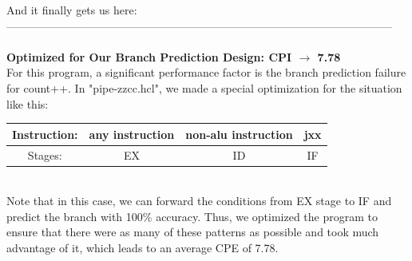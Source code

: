 \documentclass{article}
\begin{document}
And it finally gets us here:\\
--------------------------------------------------------------------------------------------------------\\
\\
\textbf{Optimized for Our Branch Prediction Design: CPI $\rightarrow$ 7.78} \\
For this program, a significant performance factor is the branch prediction failure for count++. In 
"pipe-zzcc.hcl", we made a special optimization for the situation like this:\\
\begin{tabular}{|c|c|c|c|}
        \hline Instruction:&any instruction&non-alu instruction&jxx\\
        \hline Stages:&EX&ID&IF\\
        \hline
\end{tabular}
\\
Note that in this case, we can forward the conditions from EX stage to IF and predict the branch with 100\% accuracy. 
Thus, we optimized the program to ensure that there were as many of these patterns as 
possible and took much advantage of it, which leads to an average CPE of 7.78.
\end{document}
